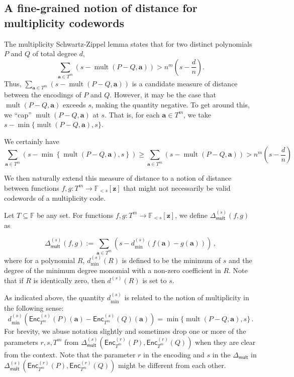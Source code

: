 \documentclass{article}
\def\Field{\mathbb{F}}
\let\F\Field
\def\veca{\mathbf{a}}
\def\vecz{\mathbf{z}}
\newcommand{\enc}{{\mathsf{Enc}}}
\newcommand{\mult}{\operatorname{mult}}
\newcommand{\Delm}{\Delta_{\mathsf{mult}}}
\newcommand{\vz}{\vecz}
\newcommand{\va}{\veca}
\begin{document}
	\subsection{A fine-grained notion of distance for multiplicity codewords}
	The multiplicity Schwartz-Zippel lemma states that for two distinct polynomials $P$ and $Q$ of total degree $d$, 
	\[ \sum_{\va \in T^m} (s-\mult(P-Q, \va)) > n^m \left( s- \frac{d}{n} \right).\]
	Thus, $\sum_{\va \in T^m} {(s-\mult(P-Q, \va))}$ is a candidate
	measure of distance between the encodings of $P$ and $Q$. However, it may be the case that
	$\mult(P-Q, \va)$ exceeds $s$, making the quantity negative. To get around this, we ``cap'' 
	$\mult(P-Q, \va)$ at $s$. That is, for each $\va \in T^m$, we take $s - \min\{\mult(P-Q, \va), s\}$.
	
	We certainly have 
	\[ \sum_{\va \in T^m}(s - \min\left\{\mult(P-Q, \va), s\right\}) \geq  \sum_{\va \in T^m} (s-\mult(P-Q, \va)) > n^m \left( s- \frac{d}{n} \right) \]
	
	We then naturally extend this measure of distance to a notion of
	distance between functions $f, g \colon T^{m} \to \F_{<s}[\vz]$ that might not necessarily be valid codewords of a multiplicity code. 
	\begin{definition}\label{def:SZ distance}
		Let $T\subseteq \F$ be any set. For functions $f, g \colon T^m \to \F_{<s}[\vz]$, we define $\Delta_{\mathsf{mult}}^{(s)} (f, g)$  as
		
		\[ \Delta_{\mathsf{mult}}^{(s)} (f, g) := \sum_{\va \in T^m} (s - d^{(s)}_{\min}(f(\va) - g(\va)))\, ,\]
		where 
		for a polynomial $R$, $d^{(s)}_{\min}(R)$ is defined
		to be the minimum of $s$ and the degree of the minimum degree monomial
		with a non-zero coefficient in $R$. Note that if $R$ is identically
		zero, then $d^{(s)}(R)$ is set to $s$.
	\end{definition}
	
	As indicated above, the quantity $d^{(s)}_{\min}$ is related to the notion of multiplicity in the following sense: 
	\[
	d^{(s)}_{\min}(\enc_{T^m}^{(s)}(P)(\va) -\enc_{T^m}^{(s)}(Q)(\va)) = \min\{\mult(P-Q, \va), s\}\, .
	\]
	For brevity, we abuse notation slightly and sometimes drop one or more of the parameters $r, s, T^m$ from $\Delm^{(s)}(\enc_{T^m}^{(r)}(P),\enc_{T^m}^{(r)}(Q))$ when they are clear from the context. Note that the parameter $r$ in the encoding and $s$ in the $\Delm$ in $\Delm^{(s)}(\enc_{T^m}^{(r)}(P),\enc_{T^m}^{(r)}(Q))$ might be different from each other. 
	
\end{document}
